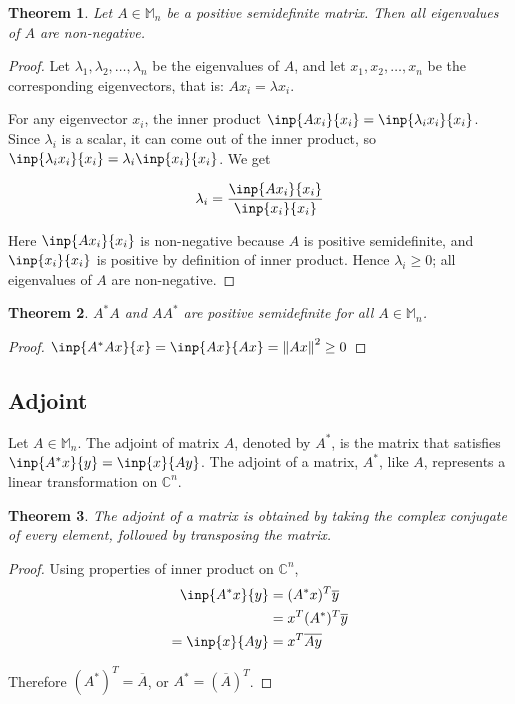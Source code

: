 \documentclass[twofold]{article}
\newcommand*\conj[1]{\overline{#1}}
\newcommand*\adj[1]{#1^*}
\newcommand*\norm[1]{\left \Vert #1 \right\Vert}
\newcommand*\trp[1]{#1^T}
\theoremstyle{plain}
\newtheorem{theorem}{Theorem}
\theoremstyle{definition}
\theoremstyle{remark}
\begin{document}
\begin{theorem} Let \(A \in \mathbb{M}_n\) be a positive semidefinite matrix. Then all eigenvalues of \(A\) are non-negative. \end{theorem}
\begin{proof} Let \(\lambda_1, \lambda_2, \ldots , \lambda_n\) be the eigenvalues of \(A\), and let \(x_1, x_2, \ldots , x_n\) be the corresponding eigenvectors, that is: \(Ax_i = \lambda x_i\). 

 For any eigenvector \(x_i\), the inner product \(\inp{Ax_i}{x_i} = \inp{\lambda_i x_i}{x_i}\). Since \(\lambda_i\) is a scalar, it can come out of the inner product, so  \( \inp{\lambda_i x_i}{x_i}  = \lambda_i \inp{x_i}{x_i}\). We get

\[\lambda_i = \frac{\inp{Ax_i}{x_i}}{\inp{x_i}{x_i}}\]

Here \(\inp{Ax_i}{x_i} \) is non-negative because \(A\) is positive semidefinite, and \(\inp{x_i}{x_i}\) is positive by definition of inner product. Hence \(\lambda_i \ge 0\); all eigenvalues of \(A\) are non-negative. \end{proof}

\begin{theorem}\label{pdm} \(\adj{A} A\) and \(A \adj{A}\) are positive semidefinite for all \(A \in \mathbb{M}_n\). \end{theorem}
\begin{proof} \(\inp{\adj{A} A x}{ x} = \inp{Ax}{Ax} = \norm{Ax}^2 \ge 0\)\end{proof}


\subsection{Adjoint}

Let \(A \in \mathbb{M}_n\). The adjoint of matrix \(A\), denoted by \(\adj{A}\), is the matrix that  satisfies \(\inp{\adj{A}x}{y} = \inp{x}{Ay}\). The adjoint of a matrix, \(\adj{A}\), like \(A\), represents a linear transformation on \(\mathbb{C}^n\).

\begin{theorem} The adjoint of a matrix is obtained by taking the complex conjugate of every element, followed by transposing the matrix. \end{theorem}

\begin{proof} Using properties of inner product on \(\mathbb{C}^n\),
\begin{equation*} \begin{split}
\inp{\adj{A}x}{y} & = \trp{(\adj{A}x)} \conj{y}  \\
& = \trp{x} \trp{(\adj{A})} \conj{y}\\
= \inp{x}{Ay} & = \trp{x} \conj{Ay} 
\end{split} \end{equation*}

Therefore \(\trp{(\adj{A})} = \conj{A}\), or \(\adj{A} = \trp{(\conj{A})}\). \end{proof}
\end{document}

